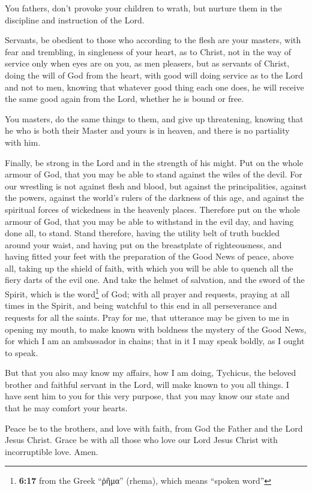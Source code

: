  You fathers, don't provoke your children to wrath, but
nurture them in the discipline and instruction of the Lord.

 Servants, be obedient to those who according to the flesh
are your masters, with fear and trembling, in singleness of your heart,
as to Christ,  not in the way of service only when eyes
are on you, as men pleasers, but as servants of Christ, doing the will
of God from the heart,  with good will doing service as to
the Lord and not to men,  knowing that whatever good thing
each one does, he will receive the same good again from the Lord,
whether he is bound or free.

 You masters, do the same things to them, and give up
threatening, knowing that he who is both their Master and yours is in
heaven, and there is no partiality with him.

 Finally, be strong in the Lord and in the strength of
his might.  Put on the whole armour of God, that you may
be able to stand against the wiles of the devil.  For our
wrestling is not against flesh and blood, but against the
principalities, against the powers, against the world's rulers of the
darkness of this age, and against the spiritual forces of wickedness in
the heavenly places.  Therefore put on the whole armour
of God, that you may be able to withstand in the evil day, and having
done all, to stand.  Stand therefore, having the utility
belt of truth buckled around your waist, and having put on the
breastplate of righteousness,  and having fitted your
feet with the preparation of the Good News of peace, 
above all, taking up the shield of faith, with which you will be able to
quench all the fiery darts of the evil one.  And take the
helmet of salvation, and the sword of the Spirit, which is the
word\footnote{\textbf{6:17} from the Greek ``ῥῆμα'' (rhema), which means
  ``spoken word''} of God;  with all prayer and requests,
praying at all times in the Spirit, and being watchful to this end in
all perseverance and requests for all the saints.  Pray
for me, that utterance may be given to me in opening my mouth, to make
known with boldness the mystery of the Good News,  for
which I am an ambassador in chains; that in it I may speak boldly, as I
ought to speak.

 But that you also may know my affairs, how I am doing,
Tychicus, the beloved brother and faithful servant in the Lord, will
make known to you all things.  I have sent him to you for
this very purpose, that you may know our state and that he may comfort
your hearts.

 Peace be to the brothers, and love with faith, from God
the Father and the Lord Jesus Christ.  Grace be with all
those who love our Lord Jesus Christ with incorruptible love. Amen.
